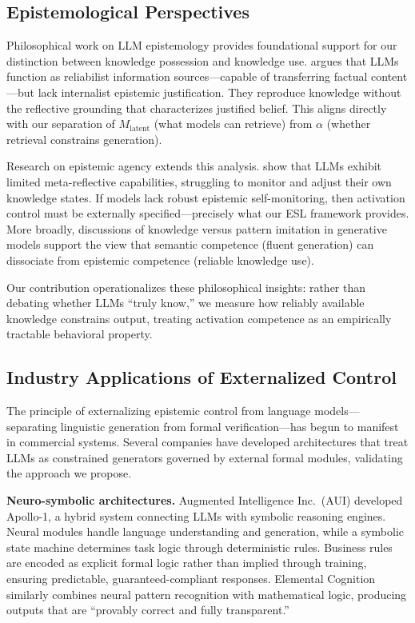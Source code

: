 \documentclass[11pt,a4paper]{article}
\begin{document}
\subsection{Epistemological Perspectives}

Philosophical work on LLM epistemology provides foundational support for our distinction between knowledge possession and knowledge use. \citet{hila2025epistemological} argues that LLMs function as reliabilist information sources---capable of transferring factual content---but lack internalist epistemic justification. They reproduce knowledge without the reflective grounding that characterizes justified belief. This aligns directly with our separation of $M_{\text{latent}}$ (what models can retrieve) from $\alpha$ (whether retrieval constrains generation).

Research on epistemic agency extends this analysis. \citet{li2025reflection} show that LLMs exhibit limited meta-reflective capabilities, struggling to monitor and adjust their own knowledge states. If models lack robust epistemic self-monitoring, then activation control must be externally specified---precisely what our ESL framework provides. More broadly, discussions of knowledge versus pattern imitation in generative models \citep{epistemologyLLM2024} support the view that semantic competence (fluent generation) can dissociate from epistemic competence (reliable knowledge use).

Our contribution operationalizes these philosophical insights: rather than debating whether LLMs ``truly know,'' we measure how reliably available knowledge constrains output, treating activation competence as an empirically tractable behavioral property.

\subsection{Industry Applications of Externalized Control}

The principle of externalizing epistemic control from language models---separating linguistic generation from formal verification---has begun to manifest in commercial systems. Several companies have developed architectures that treat LLMs as constrained generators governed by external formal modules, validating the approach we propose.

\textbf{Neuro-symbolic architectures.} Augmented Intelligence Inc.\ (AUI) developed Apollo-1, a hybrid system connecting LLMs with symbolic reasoning engines. Neural modules handle language understanding and generation, while a symbolic state machine determines task logic through deterministic rules. Business rules are encoded as explicit formal logic rather than implied through training, ensuring predictable, guaranteed-compliant responses. Elemental Cognition similarly combines neural pattern recognition with mathematical logic, producing outputs that are ``provably correct and fully transparent.''
\end{document}
